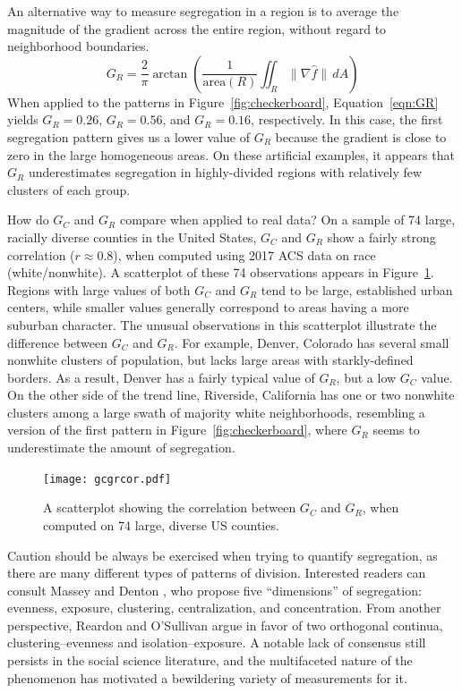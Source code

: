 \documentclass{article}
\theoremstyle{theorem}
\theoremstyle{definition}
\begin{document}
An alternative way to measure segregation in a region is to average the magnitude of the gradient across the entire region, without regard to neighborhood boundaries.
\begin{equation}\label{eqn:GR}
   G_R = \frac{2}{\pi} \arctan \left(\frac{1}{\mathrm{area}(R)} \iint_R \lVert \nabla \hat{f} \rVert \, dA \right)
\end{equation}
When applied to the patterns in Figure~\ref{fig:checkerboard}, Equation~\ref{eqn:GR} yields $G_R = 0.26$, $G_R = 0.56$, and $G_R = 0.16$, respectively. In this case, the first segregation pattern gives us a lower value of $G_R$ because the gradient is close to zero in the large homogeneous areas. On these artificial examples, it appears that $G_R$ underestimates segregation in highly-divided regions with relatively few clusters of each group.

How do $G_C$ and $G_R$ compare when applied to real data? On a sample of 74 large, racially diverse counties in the United States, $G_C$ and $G_R$ show a fairly strong correlation ($r \approx 0.8$), when computed using 2017 ACS data on race (white/nonwhite). A scatterplot of these 74 observations appears in Figure~\ref{fig:gcgrcor}. Regions with large values of both $G_C$ and $G_R$ tend to be large, established urban centers, while smaller values generally correspond to areas having a more suburban character. The unusual observations in this scatterplot illustrate the difference between $G_C$ and $G_R$. For example, Denver, Colorado has several small nonwhite clusters of population, but lacks large areas with starkly-defined borders. As a result, Denver has a fairly typical value of $G_R$, but a low $G_C$ value. On the other side of the trend line, Riverside, California has one or two nonwhite clusters among a large swath of majority white neighborhoods, resembling a version of the first pattern in Figure~\ref{fig:checkerboard}, where $G_R$ seems to underestimate the amount of segregation.

\begin{figure}
  \texttt{[image: gcgrcor.pdf]}
  \caption{A scatterplot showing the correlation between $G_C$ and $G_R$, when computed on 74 large, diverse US counties.}
  \label{fig:gcgrcor}
\end{figure}

Caution should be always be exercised when trying to quantify segregation, as there are many different types of patterns of division. Interested readers can consult Massey and Denton \cite{masseydenton88}, who propose five ``dimensions'' of segregation: evenness, exposure, clustering, centralization, and concentration. From another perspective, Reardon and O'Sullivan \cite{reardonosullivan04} argue in favor of two orthogonal continua, clustering--evenness and isolation--exposure. A notable lack of consensus still persists in the social science literature, and the multifaceted nature of the phenomenon has motivated a bewildering variety of measurements for it. \cite{harrisjohnson18}
\end{document}
